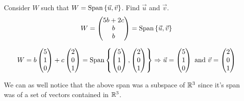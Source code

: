 \begin{example}
    Consider $W$ such that $W = \text{Span}\left\{\vec{u}, \vec{v} \right\}$. Find $\vec{u}$ and $\vec{v}$.
    \[
        W = \begin{pmatrix}
            5b + 2c \\ b \\ b
        \end{pmatrix}  = 
        \text{Span}\left\{\vec{u}, \vec{v} \right\}
    \]

    \begin{solution}
        \[
            W = b\begin{pmatrix}
                5 \\ 1 \\ 0
            \end{pmatrix} 
            +
            c\begin{pmatrix}
                2 \\ 0 \\1
            \end{pmatrix}
            =
            \text{Span}\left\{\begin{pmatrix}
                5 \\ 1 \\ 0 
            \end{pmatrix}, 
            \begin{pmatrix}
                2 \\ 0 \\ 1
            \end{pmatrix} \right\}
            \Rightarrow
            \vec{u} = \begin{pmatrix}
                5 \\ 1 \\ 0
            \end{pmatrix}
            \text{ and }
            \vec{v} = \begin{pmatrix}
                2 \\ 0 \\ 1
            \end{pmatrix}
        \]
    \end{solution}
\end{example}

We can as well notice that the above span was a subspace of $\mathbb R^3$ since it's span was of a set of vectors contained in $\mathbb R^{3}$.

